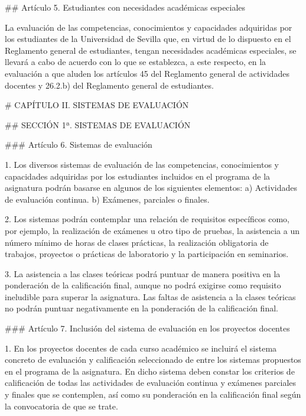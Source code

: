 \documentclass{article}
\begin{document}
\begin{itemize}
\begin{itemize}
\begin{scriptsize}
                  \#\# Artículo 5. Estudiantes con necesidades académicas especiales

                  La evaluación de las competencias, conocimientos y capacidades adquiridas por los estudiantes de la Universidad de Sevilla que, en virtud de lo dispuesto en el Reglamento general de estudiantes, tengan necesidades académicas especiales, se llevará a cabo de acuerdo con lo que se establezca, a este respecto, en la evaluación a que aluden los artículos 45 del Reglamento general de actividades docentes y 26.2.b) del Reglamento general de estudiantes.

                  \# CAPÍTULO II. SISTEMAS DE EVALUACIÓN

                  \#\# SECCIÓN 1ª. SISTEMAS DE EVALUACIÓN

                  \#\#\# Artículo 6. Sistemas de evaluación

                  1. Los diversos sistemas de evaluación de las competencias, conocimientos y capacidades adquiridas por los estudiantes incluidos en el programa de la asignatura podrán basarse en algunos de los siguientes elementos:
                  a) Actividades de evaluación continua.
                  b) Exámenes, parciales o finales.

                  2. Los sistemas podrán contemplar una relación de requisitos específicos como, por ejemplo, la realización de exámenes u otro tipo de pruebas, la asistencia a un número mínimo de horas de clases prácticas, la realización obligatoria de trabajos, proyectos o prácticas de laboratorio y la participación en seminarios.

                  3. La asistencia a las clases teóricas podrá puntuar de manera positiva en la ponderación de la calificación final, aunque no podrá exigirse como requisito ineludible para superar la asignatura. Las faltas de asistencia a la clases teóricas no podrán puntuar negativamente en la ponderación de la calificación final.

                  \#\#\# Artículo 7. Inclusión del sistema de evaluación en los proyectos docentes

                  1. En los proyectos docentes de cada curso académico se incluirá el sistema concreto de evaluación y calificación seleccionado de entre los sistemas propuestos en el programa de la asignatura. En dicho sistema deben constar los criterios de calificación de todas las actividades de evaluación continua y exámenes parciales y finales que se contemplen, así como su ponderación en la calificación final según la convocatoria de que se trate.


\end{scriptsize}
\end{itemize}
\end{itemize}
\end{document}
